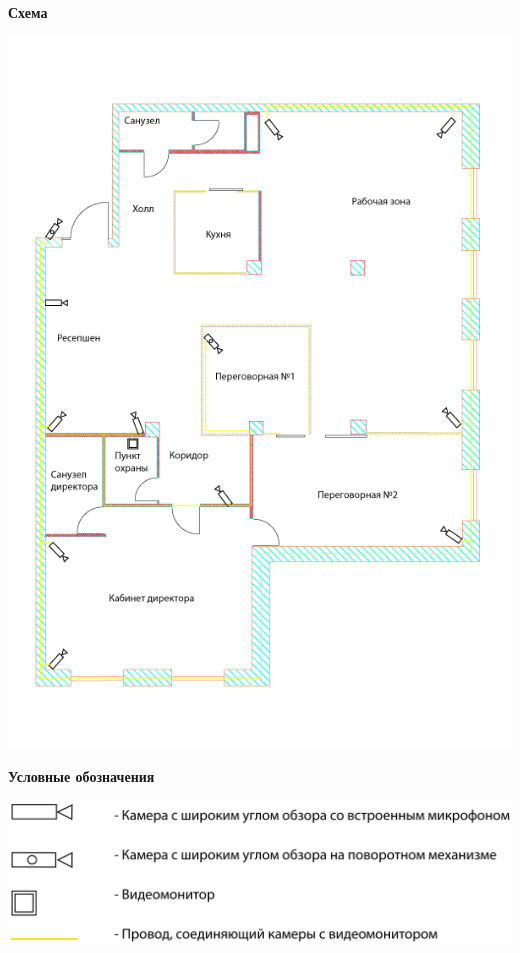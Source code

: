 \documentclass[a4paper,14pt]{extarticle}
\begin{document}
    \begin{center}
        \textbf{Схема}
    \end{center}
    \vspace{-6ex}
    \begin{center}
        \includegraphics[scale=0.65, angle=90]{pics/Cams.png}
    \end{center}
    \textbf{Условные обозначения}
    \begin{center}
        \includegraphics[scale=0.65]{pics/Cams(mark).png}
    \end{center}
\end{document}

